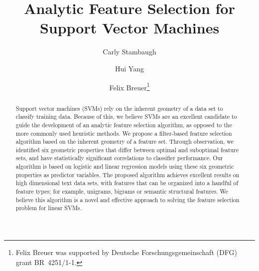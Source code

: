\documentclass{llncs}
\begin{document}
\title{Analytic Feature Selection for Support Vector Machines}
\author{Carly Stambaugh\and Hui Yang \and Felix Breuer\thanks{Felix Breuer was supported by Deutsche Forschungsgemeinschaft (DFG) grant BR~4251/1-1.}}
\maketitle
\begin{abstract}
Support vector machines (SVMs) rely on the inherent geometry of a data set to classify training data. Because of this, we believe SVMs are an excellent candidate to guide the development of an analytic feature selection algorithm, as opposed to the more commonly used heuristic methods. We propose a filter-based feature selection algorithm based on the inherent geometry of a feature set. Through observation, we identified six geometric properties that differ between optimal and suboptimal feature sets, and have statistically significant correlations to classifier performance. Our algorithm is based on logistic and linear regression models using these six geometric properties as predictor variables. The proposed algorithm achieves excellent results on high dimensional text data sets, with features that can be organized into a handful of feature types; for example, unigrams, bigrams or semantic structural features. We believe this algorithm is a novel and effective approach to solving the feature selection problem for linear SVMs.\end{abstract}
\end{document}
